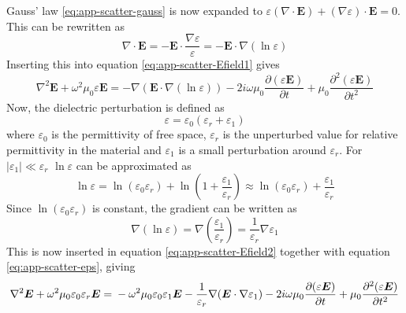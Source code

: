 \documentclass[11pt,twoside]{eitExjobb}
\begin{document}
	Gauss' law \eqref{eq:app-scatter-gauss} is now expanded to $\varepsilon(\nabla \cdot \bm{E}) + (\nabla \varepsilon) \cdot \bm{E} = 0$. This can be rewritten as
	\begin{equation*}
		\nabla \cdot \bm{E} = -\bm{E} \cdot \frac{\nabla \varepsilon}{\varepsilon} = -\bm{E} \cdot \nabla (\ln{\varepsilon})
	\end{equation*}
	Inserting this into equation \eqref{eq:app-scatter-Efield1} gives
	\begin{equation}
		\nabla^2\bm{E} + \omega^2 \mu_0 \varepsilon \bm{E} = -\nabla(\bm{E} \cdot \nabla (\ln{\varepsilon})) - 2i\omega \mu_0 \frac{\partial (\varepsilon \bm{E})}{\partial t} + \mu_0 \frac{\partial^2 (\varepsilon \bm{E})}{\partial t^2}
		\label{eq:app-scatter-Efield2}
	\end{equation}
	Now, the dielectric perturbation is defined as
	\begin{equation}
		\varepsilon = \varepsilon_0(\varepsilon_r + \varepsilon_1)
		\label{eq:app-scatter-eps}
	\end{equation}
	where $\varepsilon_0$ is the permittivity of free space, $\varepsilon_r$ is the unperturbed value for relative permittivity in the material and $\varepsilon_1$ is a small perturbation around $\varepsilon_r$. For $|\varepsilon_1| \ll \varepsilon_r$ $\ln{\varepsilon}$ can be approximated as
	\begin{equation*}
		\ln{\varepsilon} = \ln(\varepsilon_0 \varepsilon_r) + \ln(1 + \frac{\varepsilon_1}{\varepsilon_r}) \approx \ln(\varepsilon_0 \varepsilon_r) + \frac{\varepsilon_1}{\varepsilon_r}
	\end{equation*}
	Since $\ln(\varepsilon_0 \varepsilon_r)$ is constant, the gradient can be written as
	\begin{equation*}
		\nabla(\ln{\varepsilon}) = \nabla \left( \frac{\varepsilon_1}{\varepsilon_r} \right) = \frac{1}{\varepsilon_r} \nabla \varepsilon_1
	\end{equation*}
	This is now inserted in equation \eqref{eq:app-scatter-Efield2} together with equation \eqref{eq:app-scatter-eps}, giving
	\begin{equation*}
		\nabla^2\bm{E} + \omega^2 \mu_0 \varepsilon_0 \varepsilon_r \bm{E} = \\
		-\omega^2 \mu_0 \varepsilon_0 \varepsilon_1 \bm{E} -\frac{1}{\varepsilon_r}\nabla(\bm{E} \cdot \nabla \varepsilon_1) - 2i\omega \mu_0 \frac{\partial (\varepsilon \bm{E})}{\partial t} + \mu_0 \frac{\partial^2 (\varepsilon \bm{E})}{\partial t^2}
	\end{equation*}
\end{document}
